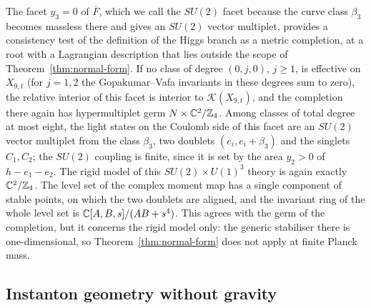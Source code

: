 The facet $y_3=0$ of $\overline F$, which we call the $SU(2)$ facet because the curve class
$\beta_3$ becomes massless there and gives an $SU(2)$ vector multiplet, provides a consistency
test of the definition of the Higgs branch as a metric completion, at a root with a Lagrangian description that lies outside the scope of
Theorem~\ref{thm:normal-form}. If no class of degree $(0,j,0)$, $j\ge1$, is effective on
$X_{9,t}$ (for $j=1,2$ the Gopakumar--Vafa invariants in these degrees sum to zero), the relative
interior of this facet is interior to $\mathcal K(X_{9,t})$, and the completion there again has
hypermultiplet germ $N\times\mathbb C^2/\mathbb Z_4$. Among classes of total degree at most eight, the light
states on the Coulomb side of this facet are an $SU(2)$ vector multiplet from the class
$\beta_3$, two doublets $(e_i,e_i+\beta_3)$ and the singlets $C_1,C_2$; the $SU(2)$ coupling is
finite, since it is set by the area $y_2>0$ of $h-e_1-e_2$. The rigid model of this
$SU(2)\times U(1)^3$ theory is again exactly $\mathbb C^2/\mathbb Z_4$. The level set of the complex moment
map has a single component of stable points, on which the two doublets are aligned, and the
invariant ring of the whole level set is $\mathbb C[A,B,s]/(AB+s^4)$. This agrees with the germ of the completion, but it
concerns the rigid model only: the generic stabiliser there is one-dimensional, so
Theorem~\ref{thm:normal-form} does not apply at finite Planck mass.

\subsection{Instanton geometry without gravity}
\label{subsec:instantons}

